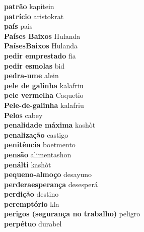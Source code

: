 \textbf{ patrão  } kapitein \\
\textbf{ patrício  } aristokrat \\
\textbf{ país  } pais \\
\textbf{ Países Baixos  } Hulanda \\
\textbf{ PaísesBaixos  } Hulanda \\
\textbf{ pedir emprestado  } fia \\
\textbf{ pedir esmolas  } bid \\
\textbf{ pedra-ume  } alein \\
\textbf{ pele de galinha  } kalafriu \\
\textbf{ pele vermelha  } Caquetio \\
\textbf{ Pele-de-galinha  } kalafriu \\
\textbf{ Pelos  } cabey \\
\textbf{ penalidade máxima  } kashòt \\
\textbf{ penalização  } castigo \\
\textbf{ penitência  } boetmento \\
\textbf{ pensão  } alimentashon \\
\textbf{ penálti  } kashòt \\
\textbf{ pequeno-almoço  } desayuno \\
\textbf{ perderaesperança  } desesperá \\
\textbf{ perdição  } destino \\
\textbf{ peremptório  } kla \\
\textbf{ perigos (segurança no trabalho)  } peligro \\
\textbf{ perpétuo  } durabel \\
